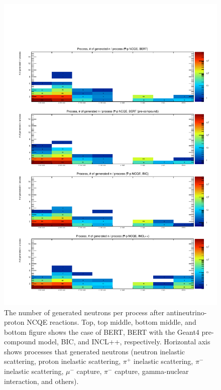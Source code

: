 \begin{figure}[h]
	\centering
	\includegraphics[width=15cm]{PDF/Secondary/Comparison_PreCompound/neutron/pdf2/Logz_Pro_NumSec_nubncqe_p}
	\caption[The number of generated neutrons per process after antineutrino-proton NCQE reactions]{
	The number of generated neutrons per process after antineutrino-proton NCQE reactions.
	Top, top middle, bottom middle, and bottom figure shows the case of BERT, BERT with the Geant4 pre-compound model, BIC, and INCL++, respectively.
	Horizontal axis shows processes that generated neutrons (neutron inelastic scattering, proton inelastic scattering, $\pi^{+}$ inelastic scattering, $\pi^{-}$ inelastic scattering, $\mu^{-}$ capture, $\pi^{-}$ capture, gamma-nuclear interaction, and others).
	}\label{Others_neutron_Logz_Pro_NumSec_nubncqe_p}
\end{figure}

